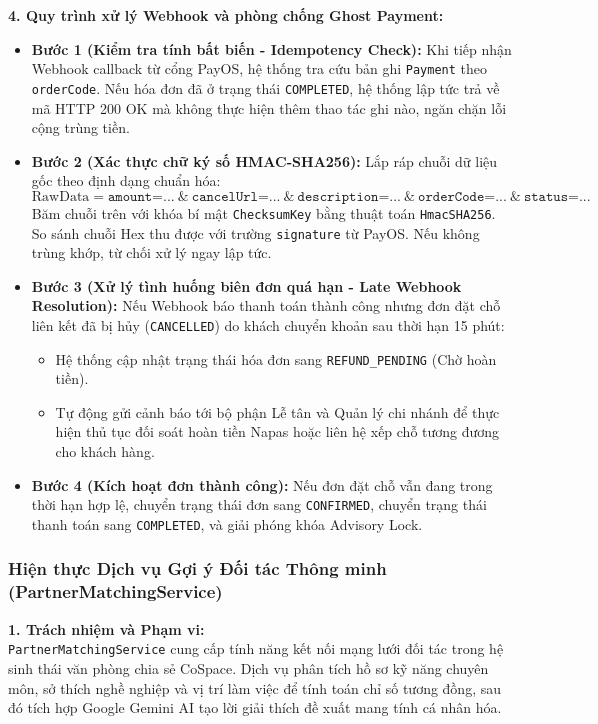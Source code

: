 \noindent\textbf{4. Quy trình xử lý Webhook và phòng chống Ghost Payment:}
\begin{itemize}
    \item \textbf{Bước 1 (Kiểm tra tính bất biến - Idempotency Check):} Khi tiếp nhận Webhook callback từ cổng PayOS, hệ thống tra cứu bản ghi \texttt{Payment} theo \texttt{orderCode}. Nếu hóa đơn đã ở trạng thái \texttt{COMPLETED}, hệ thống lập tức trả về mã HTTP 200 OK mà không thực hiện thêm thao tác ghi nào, ngăn chặn lỗi cộng trùng tiền.
    \item \textbf{Bước 2 (Xác thực chữ ký số HMAC-SHA256):} Lắp ráp chuỗi dữ liệu gốc theo định dạng chuẩn hóa:
    $$\text{RawData} = \texttt{amount=...}\ \&\ \texttt{cancelUrl=...}\ \&\ \texttt{description=...}\ \&\ \texttt{orderCode=...}\ \&\ \texttt{status=...}$$
    Băm chuỗi trên với khóa bí mật \texttt{ChecksumKey} bằng thuật toán \texttt{HmacSHA256}. So sánh chuỗi Hex thu được với trường \texttt{signature} từ PayOS. Nếu không trùng khớp, từ chối xử lý ngay lập tức.
    \item \textbf{Bước 3 (Xử lý tình huống biên đơn quá hạn - Late Webhook Resolution):} Nếu Webhook báo thanh toán thành công nhưng đơn đặt chỗ liên kết đã bị hủy (\texttt{CANCELLED}) do khách chuyển khoản sau thời hạn 15 phút:
    \begin{itemize}
        \item Hệ thống cập nhật trạng thái hóa đơn sang \texttt{REFUND\_PENDING} (Chờ hoàn tiền).
        \item Tự động gửi cảnh báo tới bộ phận Lễ tân và Quản lý chi nhánh để thực hiện thủ tục đối soát hoàn tiền Napas hoặc liên hệ xếp chỗ tương đương cho khách hàng.
    \end{itemize}
    \item \textbf{Bước 4 (Kích hoạt đơn thành công):} Nếu đơn đặt chỗ vẫn đang trong thời hạn hợp lệ, chuyển trạng thái đơn sang \texttt{CONFIRMED}, chuyển trạng thái thanh toán sang \texttt{COMPLETED}, và giải phóng khóa Advisory Lock.
\end{itemize}

\subsubsection{Hiện thực Dịch vụ Gợi ý Đối tác Thông minh (PartnerMatchingService)}

\noindent\textbf{1. Trách nhiệm và Phạm vi:}\\
\texttt{PartnerMatchingService} cung cấp tính năng kết nối mạng lưới đối tác trong hệ sinh thái văn phòng chia sẻ CoSpace. Dịch vụ phân tích hồ sơ kỹ năng chuyên môn, sở thích nghề nghiệp và vị trí làm việc để tính toán chỉ số tương đồng, sau đó tích hợp Google Gemini AI tạo lời giải thích đề xuất mang tính cá nhân hóa.


